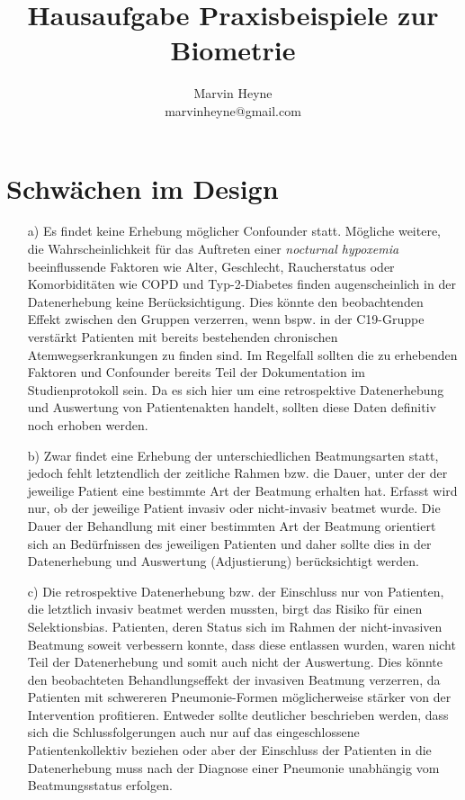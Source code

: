 \documentclass{scrartcl}
\title{Hausaufgabe Praxisbeispiele zur Biometrie}
\author{Marvin Heyne\\
  	\small marvinheyne@gmail.com \\
}
\theoremstyle{definition}
\theoremstyle{remark}
\begin{document}
\maketitle
\tableofcontents
\noindent

\section{Schwächen im Design}
\begin{enumerate}
	\item[a) ]Es findet keine Erhebung möglicher Confounder statt. Mögliche weitere, die Wahrscheinlichkeit für das Auftreten einer \textit{nocturnal hypoxemia} beeinflussende Faktoren wie Alter, Geschlecht, Raucherstatus oder Komorbiditäten wie COPD und Typ-2-Diabetes finden augenscheinlich in der Datenerhebung keine Berücksichtigung. Dies könnte den beobachtenden Effekt zwischen den Gruppen verzerren, wenn bspw. in der C19-Gruppe verstärkt Patienten mit bereits bestehenden chronischen Atemwegserkrankungen zu finden sind. Im Regelfall sollten die zu erhebenden Faktoren und Confounder bereits Teil der Dokumentation im Studienprotokoll sein. Da es sich hier um eine retrospektive Datenerhebung und Auswertung von Patientenakten handelt, sollten diese Daten definitiv noch erhoben werden. 
	\item[b) ]Zwar findet eine Erhebung der unterschiedlichen Beatmungsarten statt, jedoch fehlt letztendlich der zeitliche Rahmen bzw. die Dauer, unter der der jeweilige Patient eine bestimmte Art der Beatmung erhalten hat. Erfasst wird nur, ob der jeweilige Patient invasiv oder nicht-invasiv beatmet wurde. Die Dauer der Behandlung mit einer bestimmten Art der Beatmung orientiert sich an Bedürfnissen des jeweiligen Patienten und daher sollte dies in der Datenerhebung und Auswertung (Adjustierung) berücksichtigt werden.    
	\item[c) ]Die retrospektive Datenerhebung bzw. der Einschluss nur von Patienten, die letztlich invasiv beatmet werden mussten, birgt das Risiko für einen Selektionsbias. Patienten, deren Status sich im Rahmen der nicht-invasiven Beatmung soweit verbessern konnte, dass diese entlassen wurden, waren nicht Teil der Datenerhebung und somit auch nicht der Auswertung. Dies könnte den beobachteten Behandlungseffekt der invasiven Beatmung verzerren, da Patienten mit schwereren Pneumonie-Formen möglicherweise stärker von der Intervention profitieren. Entweder sollte deutlicher beschrieben werden, dass sich die Schlussfolgerungen auch nur auf das eingeschlossene Patientenkollektiv beziehen oder aber der Einschluss der Patienten in die Datenerhebung muss nach der Diagnose einer Pneumonie unabhängig vom Beatmungsstatus erfolgen. 

\end{enumerate}
\end{document}
